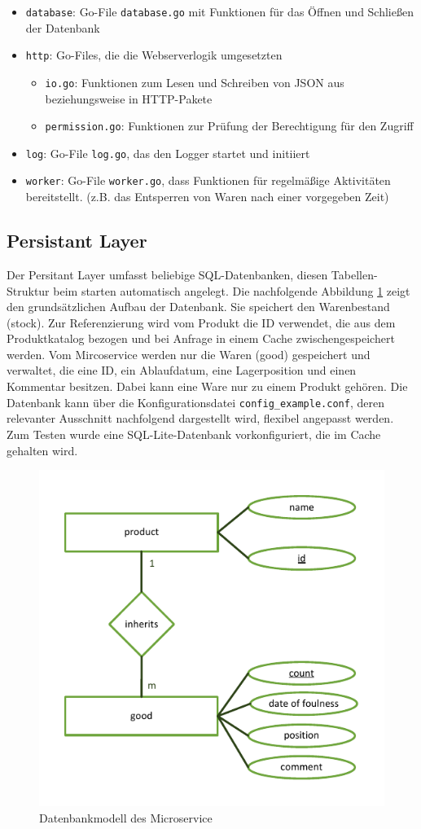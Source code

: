 	\begin{itemize}
	\item \texttt{database}: Go-File \texttt{database.go} mit Funktionen für das Öffnen und Schließen der Datenbank
	\item \texttt{http}: Go-Files, die die Webserverlogik umgesetzten
		\begin{itemize}
		\item \texttt{io.go}: Funktionen zum Lesen und Schreiben von JSON aus beziehungsweise in HTTP-Pakete
		\item \texttt{permission.go}: Funktionen zur Prüfung der Berechtigung für den Zugriff
		\end{itemize}
	\item \texttt{log}: Go-File \texttt{log.go}, das den Logger startet und initiiert
	\item \texttt{worker}: Go-File \texttt{worker.go}, dass Funktionen für regelmäßige Aktivitäten bereitstellt. (z.B. das Entsperren von Waren nach einer vorgegeben Zeit)
	\end{itemize}


\subsection{Persistant Layer}
Der Persitant Layer umfasst beliebige SQL-Datenbanken, diesen Tabellen-Struktur beim starten automatisch angelegt. Die nachfolgende Abbildung \ref{pic:Datenbankmodell des Microservice} zeigt den grundsätzlichen Aufbau der Datenbank. Sie speichert den Warenbestand (stock). Zur Referenzierung wird vom Produkt die ID verwendet, die aus dem Produktkatalog bezogen und bei Anfrage in einem Cache zwischengespeichert werden. Vom Mircoservice werden nur die Waren (good) gespeichert und verwaltet, die eine ID, ein Ablaufdatum, eine Lagerposition und einen Kommentar besitzen. Dabei kann eine Ware nur zu einem Produkt gehören. Die Datenbank kann über die Konfigurationsdatei \texttt{config\_example.conf}, deren relevanter Ausschnitt nachfolgend dargestellt wird, flexibel angepasst werden. Zum Testen wurde eine SQL-Lite-Datenbank vorkonfiguriert, die im Cache gehalten wird.

\begin{figure}[H]
	\centering
	\includegraphics[width=0.40 \textwidth]{./pics/db.pdf}
	\caption{Datenbankmodell des Microservice}
	\label{pic:Datenbankmodell des Microservice}
\end{figure}


